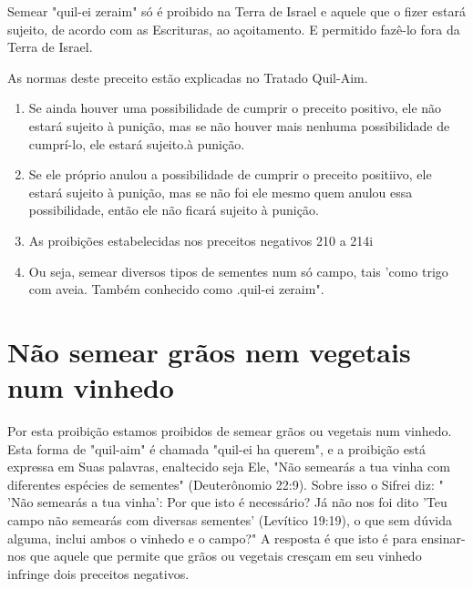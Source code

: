 Semear "quil-ei zeraim" só é proibido na Terra de Israel e aquele que o
fizer estará sujeito, de acordo com as Escrituras, ao açoitamento. E
per­mitido fazê-lo fora da Terra de Israel.


As normas deste preceito estão explicadas no Tratado Quil-Aim.

\begin{enumerate}
\def\labelenumi{\arabic{enumi}.}
\setcounter{enumi}{384}
\item
 
 Se ainda houver uma possibilidade de cumprir o preceito positivo, ele
 não estará sujeito à punição, mas se não houver mais nenhuma
 possibilidade de cumprí-lo, ele estará sujeito.à punição.
 
\item
 
 Se ele próprio anulou a possibilidade de cumprir o preceito positiivo,
 ele estará sujeito à puni­ção, mas se não foi ele mesmo quem anulou
 essa possibilidade, então ele não ficará sujeito à punição.
 
\item
 
 As proibições estabelecidas nos preceitos negativos 210 a 214i
 
\item
 
 Ou seja, semear diversos tipos de sementes num só campo, tais 'como
 trigo com aveia. Tam­bém conhecido como .quil-ei
 zeraim".
 
\end{enumerate}



\section{Não semear grãos nem vegetais num vinhedo}

Por esta proibição estamos proibidos de semear grãos ou vegetais num
vinhedo. Esta forma de "quil-aim" é chamada "quil-ei ha querem", e a
proibição está expressa em Suas palavras, enaltecido seja Ele, "Não
semearás a tua vinha com diferentes espécies de sementes" (Deuterônomio
22:9). Sobre isso o Sifrei diz: " 'Não semearás a tua vinha': Por que
isto é necessário? Já não nos foi dito 'Teu campo não semearás com
diversas sementes' (Levítico 19:19), o que sem dúvida alguma, inclui
ambos o vinhedo e o campo?" A resposta é que isto é para ensinar-nos que
aquele que permite que grãos ou vegetais cres­çam em seu vinhedo
infringe dois preceitos negativos.

